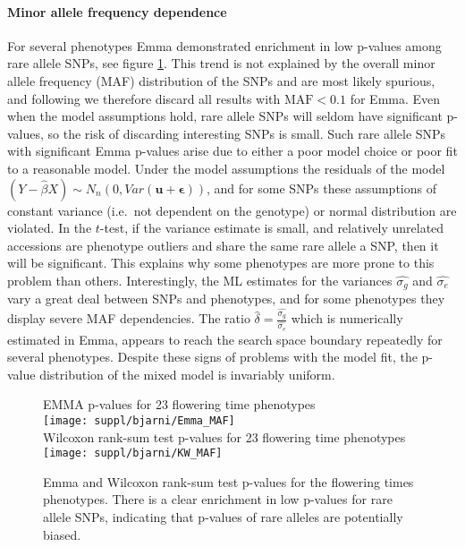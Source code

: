 \documentclass[10pt]{article}
\begin{document}
\paragraph*{Minor allele frequency dependence}

For several phenotypes Emma demonstrated enrichment in low p-values among rare allele SNPs, see figure \ref{fig:emma_maf}.  This trend is not explained by the overall minor allele frequency (MAF) distribution of the SNPs and are most likely spurious, and following \cite{kang08} we therefore discard all results with $\textrm{MAF} <0.1$ for Emma.  Even when the model assumptions hold, rare allele SNPs will seldom have significant p-values, so the risk of discarding interesting SNPs is small.    Such rare allele SNPs with significant Emma p-values arise due to either a poor model choice or poor fit to a reasonable model.  Under the model assumptions the residuals of the model $(Y-\hat{\beta} X)\sim N_n(0,Var(\mathbf{u}+\mathbf{\epsilon}))$, and for some SNPs these assumptions of constant variance (i.e.~not dependent on the genotype) or normal distribution are violated.  In the $t$-test, if the variance estimate is small, and relatively unrelated accessions are phenotype outliers and share the same rare allele a SNP, then it will be significant.  This explains why some phenotypes are more prone to this problem than others.  Interestingly, the ML estimates for the variances $\hat{\sigma_{g}}$ and $\hat{\sigma_{e}}$ vary a great deal between SNPs and phenotypes, and for some phenotypes they display severe MAF dependencies.  The ratio $\hat{\delta} = \frac{\hat{\sigma_{g}}}{\hat{\sigma_{e}}}$ which is numerically estimated in Emma, appears to reach the search space boundary repeatedly for several phenotypes.  Despite these signs of problems with the model fit, the p-value distribution of the mixed model is invariably uniform.

\begin{figure}
  \centering
  EMMA p-values for 23 flowering time phenotypes\\
  \texttt{[image: suppl/bjarni/Emma\_MAF]}\\[0.2in]
  Wilcoxon rank-sum test p-values for 23 flowering time phenotypes\\
  \texttt{[image: suppl/bjarni/KW\_MAF]}
  \caption{Emma and Wilcoxon rank-sum test p-values for the flowering times phenotypes.  There is a clear enrichment in low p-values for rare allele SNPs, indicating that p-values of rare alleles are potentially biased.}
  \label{fig:emma_maf}
\end{figure}
\end{document}
